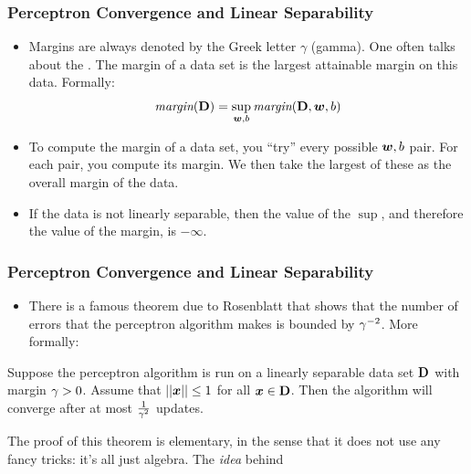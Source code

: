 \documentclass[trans]{beamer}
\begin{document}
\begin{frame}
  \frametitle{Perceptron Convergence and Linear Separability}
\begin{itemize}
\item Margins
are always denoted by the Greek letter $\gamma$ (gamma).  One often
talks about the .  The margin of a data
set is the largest attainable margin on this data.  Formally:
\begin{equation} \label{eq:margin2}
\textit{margin}(\text{\bf D})
= 
\sup_{{\boldsymbol{w}},b} \textit{margin}(\text{\bf D}, {\boldsymbol{w}}, b)
\end{equation}
\item To compute the margin of a data set, you ``try'' every
possible ${\boldsymbol{w}},b$ pair.  For each pair, you compute its margin.  We
then take the largest of these as the overall margin of the
data.%
\item     If the data is not linearly separable, then the value
of the $\sup$, and therefore the value of the margin, is $-\infty$.
\end{itemize}
\end{frame}
\begin{frame}
  \frametitle{Perceptron Convergence and Linear Separability}
\begin{itemize}
\item
There is a famous theorem due to
Rosenblatt \cite{rosenblatt58perceptron} that shows that the number
of errors that the perceptron algorithm makes is bounded by
$\gamma^{-2}$.  More formally:
\end{itemize}
\begin{theorem} \label{thm:perc:perc}
  Suppose the perceptron algorithm is run on a linearly separable data
  set $\text{\bf D}$ with margin $\gamma > 0$.  Assume that $\left\vert\left\vert {\boldsymbol{x}} \right\vert\right\vert \leq 1$
  for all ${\boldsymbol{x}} \in \text{\bf D}$.  Then the algorithm will converge after at
  most $\frac 1 {\gamma^2}$ updates.
\end{theorem}

\end{frame}
\iffalse
The proof of this theorem is elementary, in the sense that it does not
use any fancy tricks: it's all just algebra.  The \emph{idea} behind
\end{document}
